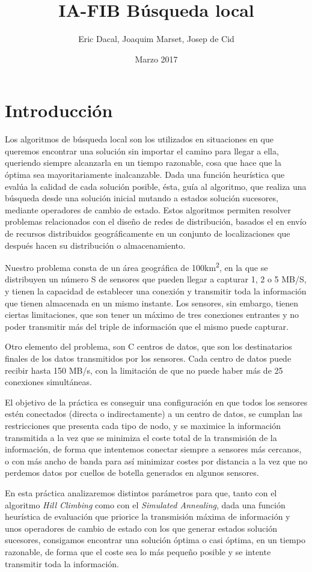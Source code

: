 \documentclass{article}
\title{\LARGE IA-FIB Búsqueda local}
\author{\large Eric Dacal, Joaquim Marset, Josep de Cid}
\date{Marzo 2017}
\begin{document}
\maketitle

\section{Introducción}

Los algoritmos de búsqueda local son los utilizados en situaciones en que queremos encontrar una solución sin importar el camino para llegar a ella, queriendo siempre alcanzarla en un tiempo razonable, cosa que hace que la óptima sea mayoritariamente inalcanzable. Dada una función heurística que evalúa la calidad de cada solución posible, ésta, guía al algoritmo, que realiza una búsqueda desde una solución inicial mutando a estados solución sucesores, mediante operadores de cambio de estado. Estos algoritmos permiten resolver problemas relacionados con el diseño de redes de distribución, basados el en envío de recursos distribuidos geográficamente en un conjunto de localizaciones que después hacen su distribución o almacenamiento.\par
Nuestro problema consta de un área geográfica de 100km\textsuperscript{2}, en la que se distribuyen un número S de sensores que pueden llegar a capturar 1, 2 o 5 MB/S, y tienen la capacidad de establecer una conexión y transmitir toda la información que tienen almacenada en un mismo instante. Los sensores, sin embargo, tienen ciertas limitaciones, que son tener un máximo de tres conexiones entrantes y no poder transmitir más del triple de información que el mismo puede capturar.\par
Otro elemento del problema, son C centros de datos, que son los destinatarios finales de los datos transmitidos por los sensores. Cada centro de datos puede recibir hasta 150 MB/s, con la limitación de que no puede haber más de 25 conexiones simultáneas.

El objetivo de la práctica es conseguir una configuración en que todos los sensores estén conectados (directa o indirectamente) a un centro de datos, se cumplan las restricciones que presenta cada tipo de nodo, y se maximice la información transmitida a la vez que se minimiza el coste total de la transmisión de la información, de forma que intentemos conectar siempre a sensores más cercanos, o con más ancho de banda para así minimizar costes por distancia a la vez que no perdemos datos por cuellos de botella generados en algunos sensores.\par
En esta práctica analizaremos distintos parámetros para que, tanto con el algoritmo \textit{Hill Climbing} como con el \textit{Simulated Annealing}, dada una función heurística de evaluación que priorice la transmisión máxima de información y unos operadores de cambio de estado con los que generar estados solución sucesores, consigamos encontrar una solución óptima o casi óptima, en un tiempo razonable, de forma que el coste sea lo más pequeño posible y se intente transmitir toda la información.
\end{document}
